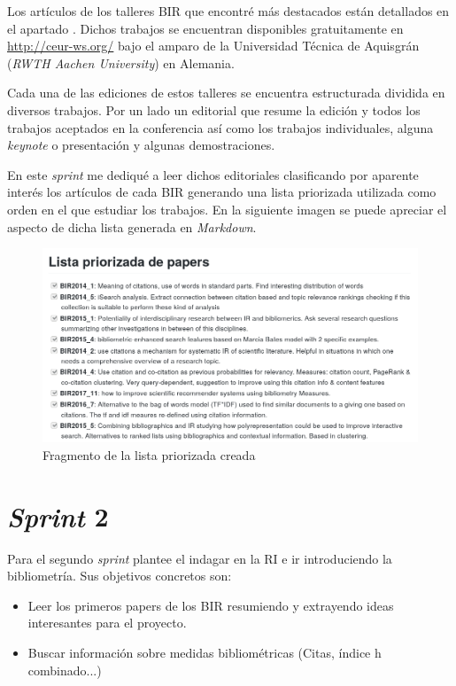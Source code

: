 Los artículos de los talleres \acrlong{BIR} que encontré más destacados están detallados en el apartado . Dichos trabajos se encuentran disponibles gratuitamente en \url{http://ceur-ws.org/} bajo el amparo de la Universidad Técnica de Aquisgrán (\textit{RWTH Aachen University}) en Alemania.

Cada una de las ediciones de estos talleres se encuentra estructurada dividida en diversos trabajos. Por un lado un editorial que resume la edición y todos los trabajos aceptados en la conferencia así como los trabajos individuales, alguna \textit{keynote} o presentación y algunas demostraciones. 

En este \textit{sprint} me dediqué a leer dichos editoriales clasificando por aparente interés los artículos de cada \acrshort{BIR} generando una lista priorizada utilizada como orden en el que estudiar los trabajos. En la siguiente imagen se puede apreciar el aspecto de dicha lista generada en \textit{Markdown}.

\begin{figure}[ht]
	
	\centering
	\includegraphics[width=\linewidth]{imagenes/lista_priorizada}
	\caption{Fragmento de la lista priorizada creada}
\end{figure}

\section{\textit{Sprint} 2}
Para el segundo \textit{sprint} plantee el indagar en la \acrshort{RI} e ir introduciendo la bibliometría. Sus objetivos concretos son: 

\begin{itemize}
	\item Leer los primeros papers de los \acrshort{BIR} resumiendo y extrayendo ideas interesantes para el proyecto.
	\item Buscar información sobre medidas bibliométricas (Citas, índice h combinado...)
\end{itemize}

